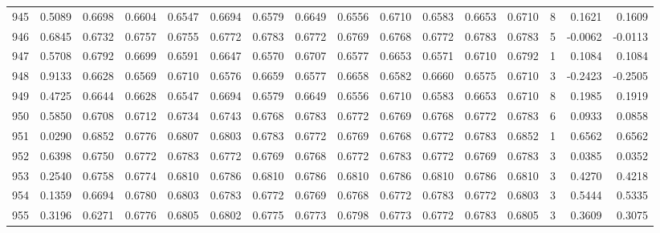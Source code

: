\begin{tabular}{lrrrrrrrrrrrrrrr}
945 &      0.5089 &  0.6698 &  0.6604 &  0.6547 &  0.6694 &  0.6579 &  0.6649 &  0.6556 &  0.6710 &  0.6583 &   0.6653 &     0.6710 &      8 &                    0.1621 &                     0.1609 \\
946 &      0.6845 &  0.6732 &  0.6757 &  0.6755 &  0.6772 &  0.6783 &  0.6772 &  0.6769 &  0.6768 &  0.6772 &   0.6783 &     0.6783 &      5 &                   -0.0062 &                    -0.0113 \\
947 &      0.5708 &  0.6792 &  0.6699 &  0.6591 &  0.6647 &  0.6570 &  0.6707 &  0.6577 &  0.6653 &  0.6571 &   0.6710 &     0.6792 &      1 &                    0.1084 &                     0.1084 \\
948 &      0.9133 &  0.6628 &  0.6569 &  0.6710 &  0.6576 &  0.6659 &  0.6577 &  0.6658 &  0.6582 &  0.6660 &   0.6575 &     0.6710 &      3 &                   -0.2423 &                    -0.2505 \\
949 &      0.4725 &  0.6644 &  0.6628 &  0.6547 &  0.6694 &  0.6579 &  0.6649 &  0.6556 &  0.6710 &  0.6583 &   0.6653 &     0.6710 &      8 &                    0.1985 &                     0.1919 \\
950 &      0.5850 &  0.6708 &  0.6712 &  0.6734 &  0.6743 &  0.6768 &  0.6783 &  0.6772 &  0.6769 &  0.6768 &   0.6772 &     0.6783 &      6 &                    0.0933 &                     0.0858 \\
951 &      0.0290 &  0.6852 &  0.6776 &  0.6807 &  0.6803 &  0.6783 &  0.6772 &  0.6769 &  0.6768 &  0.6772 &   0.6783 &     0.6852 &      1 &                    0.6562 &                     0.6562 \\
952 &      0.6398 &  0.6750 &  0.6772 &  0.6783 &  0.6772 &  0.6769 &  0.6768 &  0.6772 &  0.6783 &  0.6772 &   0.6769 &     0.6783 &      3 &                    0.0385 &                     0.0352 \\
953 &      0.2540 &  0.6758 &  0.6774 &  0.6810 &  0.6786 &  0.6810 &  0.6786 &  0.6810 &  0.6786 &  0.6810 &   0.6786 &     0.6810 &      3 &                    0.4270 &                     0.4218 \\
954 &      0.1359 &  0.6694 &  0.6780 &  0.6803 &  0.6783 &  0.6772 &  0.6769 &  0.6768 &  0.6772 &  0.6783 &   0.6772 &     0.6803 &      3 &                    0.5444 &                     0.5335 \\
955 &      0.3196 &  0.6271 &  0.6776 &  0.6805 &  0.6802 &  0.6775 &  0.6773 &  0.6798 &  0.6773 &  0.6772 &   0.6783 &     0.6805 &      3 &                    0.3609 &                     0.3075 \\

\end{tabular}
